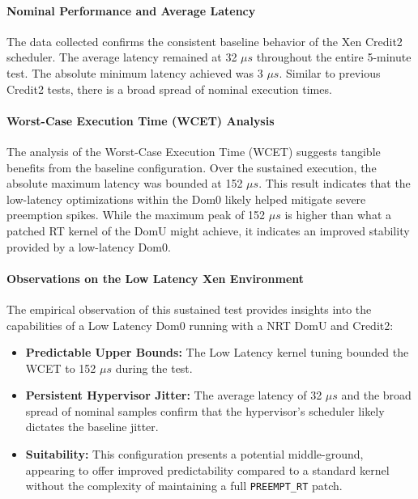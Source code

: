 \paragraph{Nominal Performance and Average
Latency}\label{nominal-performance-and-average-latency-9}

The data collected confirms the consistent baseline behavior of the Xen
Credit2 scheduler. The average latency remained at 32 $\mu s$ throughout the
entire 5-minute test. The absolute minimum latency achieved was 3 $\mu s$.
Similar to previous Credit2 tests, there is a broad spread of nominal
execution times.

\paragraph{Worst-Case Execution Time (WCET)
Analysis}\label{worst-case-execution-time-wcet-analysis-11}

The analysis of the Worst-Case Execution Time (WCET) suggests tangible
benefits from the baseline configuration. Over the sustained execution,
the absolute maximum latency was bounded at 152 $\mu s$. This result
indicates that the low-latency optimizations within the Dom0 likely
helped mitigate severe preemption spikes. While the maximum peak of 152
$\mu s$ is higher than what a patched RT kernel of the DomU might achieve, it
indicates an improved stability provided by a low-latency Dom0.

\paragraph{Observations on the Low Latency Xen
Environment}\label{observations-on-the-low-latency-xen-environment}

The empirical observation of this sustained test provides insights into
the capabilities of a Low Latency Dom0 running with a NRT DomU and
Credit2:

\begin{itemize}
\item
  \textbf{Predictable Upper Bounds:} The Low Latency kernel tuning
  bounded the WCET to 152 $\mu s$ during the test.
\item
  \textbf{Persistent Hypervisor Jitter:} The average latency of 32 $\mu s$
  and the broad spread of nominal samples confirm that the hypervisor's
  scheduler likely dictates the baseline jitter.
\item
  \textbf{Suitability:} This configuration presents a potential
  middle-ground, appearing to offer improved predictability compared to
  a standard kernel without the complexity of maintaining a full
  \texttt{PREEMPT\_RT} patch.
\end{itemize}

